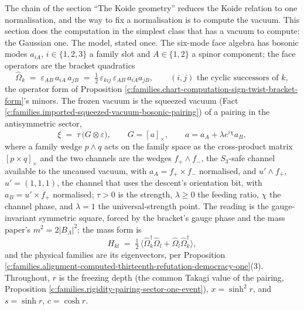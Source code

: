 \documentclass[11pt]{article}
\theoremstyle{definition}
\theoremstyle{plain}
\begin{document}
\label{c:note.families.setting-gaussian-theorems}
The chain of the section ``The Koide geometry'' reduces the Koide relation to one normalisation, and the way to fix a normalisation is to compute the vacuum. This section does the computation in the simplest class that has a vacuum to compute: the Gaussian one. The model, stated once. The six-mode face algebra has bosonic modes $a_{iA}$, $i \in \{1,2,3\}$ a family slot and $A \in \{1,2\}$ a spinor component; the face operators are the bracket quadratics
\[
\hat\Omega_{k} \;=\; \varepsilon_{AB}\,a_{iA}\,a_{jB} \;=\; \tfrac12\,\varepsilon_{kij}\,\varepsilon_{AB}\,a_{iA}a_{jB}, \qquad (i,j) \text{ the cyclic successors of } k,
\]
the operator form of Proposition \ref{c:families.chart-computation-sign-twist-bracket-form}'s minors. The frozen vacuum is the squeezed vacuum (Fact \ref{c:families.imported-squeezed-vacuum-bosonic-pairing}) of a pairing in the antisymmetric sector,
\[
\xi \;=\; \tau\,\bigl(G \otimes \varepsilon\bigr), \qquad G = [a]_{\times}, \qquad a = a_{A} + \lambda e^{i\chi}a_{B},
\]
where a family wedge $p \wedge q$ acts on the family space as the cross-product matrix $[p \times q]_{\times}$ and the two channels are the wedges $f_{+} \wedge f_{-}$, the $S_{3}$-safe channel available to the uncaused vacuum, with $a_{A} = f_{+} \times f_{-}$ normalised, and $u' \wedge f_{+}$, $u' = (1,1,1)$, the channel that uses the descent's orientation bit, with $a_{B} = u' \times f_{+}$ normalised; $\tau > 0$ is the strength, $\lambda \ge 0$ the feeding ratio, $\chi$ the channel phase, and $\lambda = 1$ the universal-strength point. The reading is the gauge-invariant symmetric square, forced by the bracket's gauge phase and the mass paper's $m^{2} = 2|B_{\Lambda}|^{2}$: the mass form is
\[
H_{kl} \;=\; \tfrac12\,\bigl\langle \hat\Omega_{k}^{\dagger}\hat\Omega_{l} + \hat\Omega_{l}\hat\Omega_{k}^{\dagger}\bigr\rangle,
\]
and the physical families are its eigenvectors, per Proposition \ref{c:families.alignment-computed-thirteenth-refutation-democracy-one}(3). Throughout, $r$ is the freezing depth (the common Takagi value of the pairing, Proposition \ref{c:families.rigidity-pairing-sector-one-event}), $x = \sinh^{2}r$, and $s = \sinh r$, $c = \cosh r$.
\end{document}
